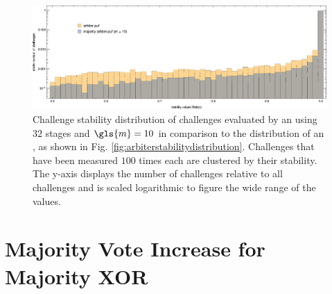 \begin{figure}[ht]
\includegraphics[width=1.00\textwidth]{images/comparison-arbiter-stability-distribution-majority-arbiter-stability-distribution.eps}
\caption[Challenge stability distribution comparison of an \mpuf]{Challenge stability distribution of challenges evaluated by an \mpuf using $32$ stages and $\gls{m} = 10$ in comparison to the distribution of an \apuf, as shown in Fig. \ref{fig:arbiterstabilitydistribution}. Challenges that have been measured $100$ times each are clustered by their stability. The y-axis displays the number of challenges relative to all challenges and is scaled logarithmic to figure the wide range of the values.} 
\label{fig:comparisonarbiterstabilitydistributionmajorityarbiterstabilitydistribution}
\end{figure}



\section{Majority Vote Increase for Majority \acs{XOR} \apufs}
\label{sec:majorityvotegrowth}

